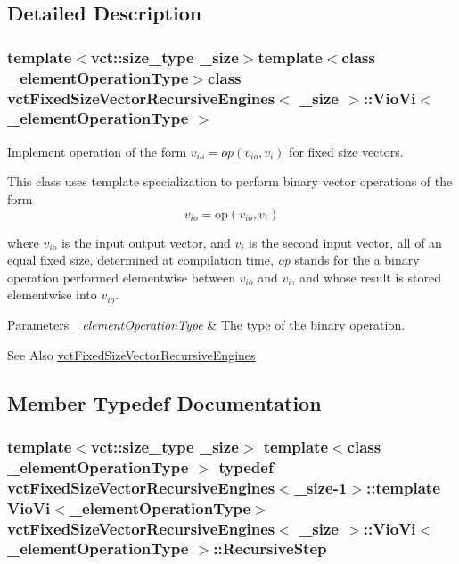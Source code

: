 \subsection{Detailed Description}
\subsubsection*{template$<$vct\-::size\-\_\-type \-\_\-size$>$template$<$class \-\_\-element\-Operation\-Type$>$class vct\-Fixed\-Size\-Vector\-Recursive\-Engines$<$ \-\_\-size $>$\-::\-Vio\-Vi$<$ \-\_\-element\-Operation\-Type $>$}

Implement operation of the form $v_{io} = op(v_{io}, v_i)$ for fixed size vectors. 

This class uses template specialization to perform binary vector operations of the form \[ v_{io} = \mathrm{op}(v_{io}, v_{i}) \]

where $v_{io}$ is the input output vector, and $v_{i}$ is the second input vector, all of an equal fixed size, determined at compilation time, {\itshape op} stands for the a binary operation performed elementwise between $v_{io}$ and $v_{i}$, and whose result is stored elementwise into $v_{io}$.


\begin{DoxyParams}{Parameters}
{\em \-\_\-element\-Operation\-Type} & The type of the binary operation.\\
\hline
\end{DoxyParams}
\begin{DoxySeeAlso}{See Also}
\hyperlink{classvct_fixed_size_vector_recursive_engines}{vct\-Fixed\-Size\-Vector\-Recursive\-Engines} 
\end{DoxySeeAlso}


\subsection{Member Typedef Documentation}
\hypertarget{classvct_fixed_size_vector_recursive_engines_1_1_vio_vi_a1b0e842f1ca3b4e60a18b11e85382449}{
\subsubsection[{Recursive\-Step}]{\setlength{\rightskip}{0pt plus 5cm}template$<$vct\-::size\-\_\-type \-\_\-size$>$ template$<$class \-\_\-element\-Operation\-Type $>$ typedef {\bf vct\-Fixed\-Size\-Vector\-Recursive\-Engines}$<$\-\_\-size-\/1$>$\-::template {\bf Vio\-Vi}$<$\-\_\-element\-Operation\-Type$>$ {\bf vct\-Fixed\-Size\-Vector\-Recursive\-Engines}$<$ \-\_\-size $>$\-::{\bf Vio\-Vi}$<$ \-\_\-element\-Operation\-Type $>$\-::{\bf Recursive\-Step}}}\label{classvct_fixed_size_vector_recursive_engines_1_1_vio_vi_a1b0e842f1ca3b4e60a18b11e85382449}


